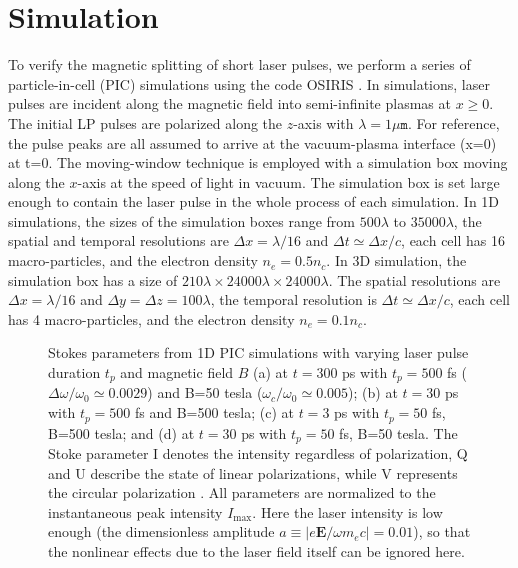 \documentclass[%
aps,
preprint,
showpacs,
preprintnumbers,
 amsmath,
 amssymb,
 prl,
]{revtex4-1}
\begin{document}
\section{Simulation}



To verify the magnetic splitting of short laser pulses, we perform a series of particle-in-cell (PIC) simulations using the code OSIRIS \cite{Fonseca}.
In simulations, laser pulses are incident along the magnetic field into semi-infinite plasmas at $x\geq0$.
The initial LP pulses are polarized along the $z$-axis with $\lambda=1\mu\texttt{m}$.
For reference, the pulse peaks are all assumed to arrive at the vacuum-plasma interface (x=0) at t=0.
The moving-window technique is employed with a simulation box moving along the $x$-axis at the speed of light in vacuum. The simulation box is set large enough to contain the laser pulse in the whole process of each simulation.
In 1D simulations, the sizes of the simulation boxes range from $500\lambda$ to $35000\lambda$, the spatial and temporal resolutions are $\Delta x=\lambda/16$ and  $\Delta t \simeq \Delta x/c$, each cell has 16 macro-particles, and the electron density $n_e=0.5n_c$.
In 3D simulation, the simulation box has a size of $210\lambda \times 24000 \lambda \times 24000 \lambda$. The spatial resolutions are $\Delta x=\lambda/16$ and $\Delta y=\Delta z=100 \lambda$, the temporal resolution is $\Delta t \simeq \Delta x/c$, each cell has 4 macro-particles, and the electron density $n_e=0.1n_c$.

\begin{figure}[htbp]
\centering
{}
\caption{Stokes parameters from 1D PIC simulations with varying laser pulse duration $t_p$ and magnetic field $B$ (a) at $t=300$ ps with $t_p=500$ fs ($\Delta\omega/\omega_0\simeq0.0029$) and B=50 tesla ($\omega_c/\omega_0\simeq0.005$); (b) at $t=30$ ps with $t_p=500$ fs and B=500 tesla; (c) at $t=3$ ps with $t_p=50$ fs, B=500 tesla; and (d) at $t=30$ ps with $t_p=50$ fs, B=50 tesla. The Stoke parameter I denotes the intensity regardless of polarization, Q and U describe the state of linear polarizations, while V represents the circular polarization \cite{Tinbergen}. All parameters are normalized to the instantaneous peak intensity $I_{\max}$. Here the laser intensity is low enough (the dimensionless amplitude $a\equiv|e\textbf{E}/\omega m_e c|=0.01$), so that the nonlinear effects \cite{GibbonBook,HoraBook} due to the laser field itself can be ignored here.
}
\label{fig1D}
\end{figure}
\end{document}
